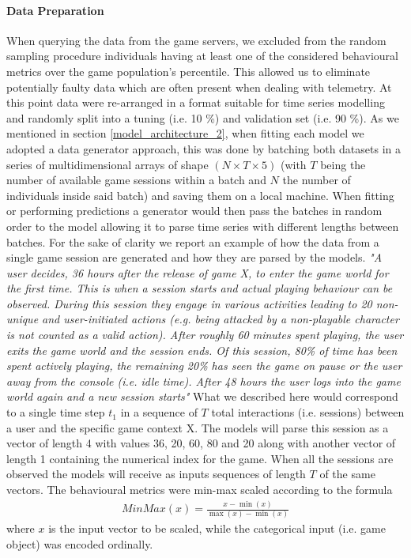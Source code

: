 \paragraph*{Data Preparation} When querying the data from the game servers, we excluded from the random sampling procedure individuals having at least one of the considered behavioural metrics over the game population's  percentile. This allowed us to eliminate potentially faulty data which are often present when dealing with telemetry. At this point data were re-arranged in a format suitable for time series modelling and randomly split into a tuning (i.e. 10 \%) and validation set (i.e. 90 \%). As we mentioned in section \ref{model_architecture_2}, when fitting each model we adopted a data generator approach, this was done by batching both datasets in a series of multidimensional arrays of shape $(N \times T \times 5)$ (with $T$ being the number of available game sessions within a batch and $N$ the number of individuals inside said batch) and saving them on a local machine. When fitting or performing predictions a generator would then pass the batches in random order to the model allowing it to parse time series with different lengths between batches. For the sake of clarity we report an example of how the data from a single game session are generated and how they are parsed by the models.
\textit{
"A user decides, 36 hours after the release of game X, to enter the game world for the first time. This is when a session starts and actual playing behaviour can be observed. During this session they engage in various activities leading to 20 non-unique and user-initiated actions (e.g. being attacked by a non-playable character is not counted as a valid action). After roughly 60 minutes spent playing, the user exits the game world and the session ends. Of this session, 80\% of time has been spent actively playing, the remaining 20\% has seen the game on pause or the user away from the console (i.e. idle time). After 48 hours the user logs into the game world again and a new session starts"}
What we described here would correspond to a single time step $t_{1}$ in a sequence of $T$ total interactions (i.e. sessions) between a user and the specific game context X. The models will parse this session as a vector of length 4 with values 36, 20, 60, 80 and 20 along with another vector of length 1 containing the numerical index for the game. When all the sessions are observed the models will receive as inputs sequences of length $T$ of the same vectors. The behavioural metrics were min-max scaled according to the formula
\begin{equation}
  \begin{gathered} 
  \label{min_max}
        MinMax(x) =\frac{x - \min(x)} {\max(x) - \min(x)} 
  \end{gathered}
\end{equation}
where $x$ is the input vector to be scaled, while the categorical input (i.e. game object) was encoded ordinally.

